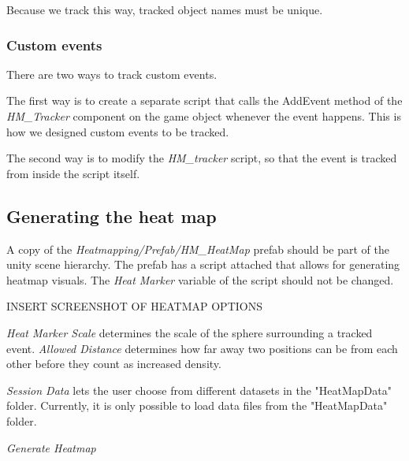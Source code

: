 Because we track this way, tracked object names must be unique. 

\subsubsection{Custom events}
There are two ways to track custom events. 

The first way is to create a separate script that calls the AddEvent method of the \textit{HM\_Tracker} component on the game object whenever the event happens. This is how we designed custom events to be tracked.

The second way is to modify the \textit{HM\_tracker} script, so that the event is tracked from inside the script itself.

\subsection{Generating the heat map}
\label{HowToUse_Generating}
A copy of the \textit{Heatmapping/Prefab/HM\_HeatMap} prefab should be part of the unity scene hierarchy. The prefab has a script attached that allows for generating heatmap visuals. The \textit{Heat Marker} variable of the script should not be changed. 

INSERT SCREENSHOT OF HEATMAP OPTIONS

\textit{Heat Marker Scale} determines the scale of the sphere surrounding a tracked event. \textit{Allowed Distance} determines how far away two positions can be from each other before they count as increased density.

\textit{Session Data} lets the user choose from different datasets in the "HeatMapData" folder. Currently, it is only possible to load data files from the "HeatMapData" folder.

\textit{Generate Heatmap}
